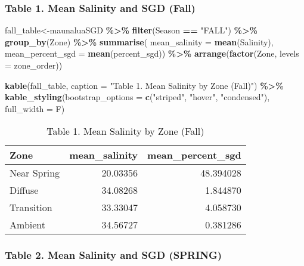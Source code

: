 \documentclass[
]{article}
\newenvironment{Shaded}{\begin{snugshade}}{\end{snugshade}}
\newcommand{\AttributeTok}[1]{\textcolor[rgb]{0.13,0.29,0.53}{#1}}
\newcommand{\FunctionTok}[1]{\textcolor[rgb]{0.13,0.29,0.53}{\textbf{#1}}}
\newcommand{\NormalTok}[1]{#1}
\newcommand{\OtherTok}[1]{\textcolor[rgb]{0.56,0.35,0.01}{#1}}
\newcommand{\SpecialCharTok}[1]{\textcolor[rgb]{0.81,0.36,0.00}{\textbf{#1}}}
\newcommand{\StringTok}[1]{\textcolor[rgb]{0.31,0.60,0.02}{#1}}
\begin{document}
\subsubsection{Table 1. Mean Salinity and SGD
(Fall)}\label{table-1.-mean-salinity-and-sgd-fall}

\begin{Shaded}
\begin{Highlighting}[]
\NormalTok{fall\_table}\OtherTok{\textless{}{-}}\NormalTok{maunaluaSGD }\SpecialCharTok{\%\textgreater{}\%}
  \FunctionTok{filter}\NormalTok{(Season }\SpecialCharTok{==} \StringTok{"FALL"}\NormalTok{) }\SpecialCharTok{\%\textgreater{}\%}
  \FunctionTok{group\_by}\NormalTok{(Zone) }\SpecialCharTok{\%\textgreater{}\%} 
  \FunctionTok{summarise}\NormalTok{(}
    \AttributeTok{mean\_salinity =} \FunctionTok{mean}\NormalTok{(Salinity),}
    \AttributeTok{mean\_percent\_sgd =} \FunctionTok{mean}\NormalTok{(percent\_sgd)) }\SpecialCharTok{\%\textgreater{}\%}
  \FunctionTok{arrange}\NormalTok{(}\FunctionTok{factor}\NormalTok{(Zone, }\AttributeTok{levels =}\NormalTok{ zone\_order))}

\FunctionTok{kable}\NormalTok{(fall\_table, }\AttributeTok{caption =} \StringTok{"Table 1. Mean Salinity by Zone (Fall)"}\NormalTok{) }\SpecialCharTok{\%\textgreater{}\%}
  \FunctionTok{kable\_styling}\NormalTok{(}\AttributeTok{bootstrap\_options =} \FunctionTok{c}\NormalTok{(}\StringTok{"striped"}\NormalTok{,}
                                      \StringTok{"hover"}\NormalTok{,}
                                      \StringTok{"condensed"}\NormalTok{), }\AttributeTok{full\_width =}\NormalTok{ F)}
\end{Highlighting}
\end{Shaded}

\begin{longtable}[t]{lrr}
\caption{\label{tab:unnamed-chunk-5}Table 1. Mean Salinity by Zone (Fall)}\\
\toprule
Zone & mean\_salinity & mean\_percent\_sgd\\
\midrule
Near Spring & 20.03356 & 48.394028\\
Diffuse & 34.08268 & 1.844870\\
Transition & 33.33047 & 4.058730\\
Ambient & 34.56727 & 0.381286\\
\bottomrule
\end{longtable}

\subsubsection{Table 2. Mean Salinity and SGD
(SPRING)}\label{table-2.-mean-salinity-and-sgd-spring}
\end{document}
